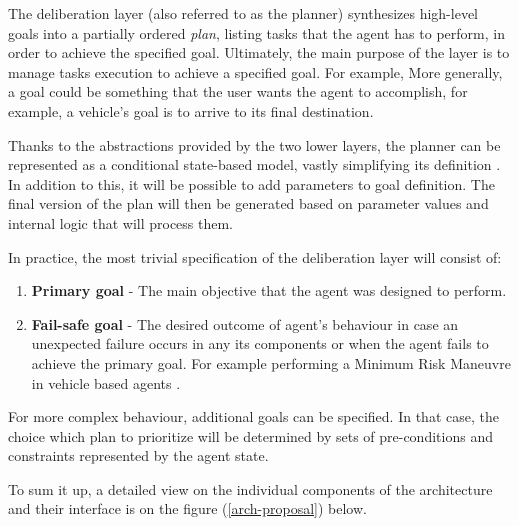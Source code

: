 \documentclass[main.tex]{subfiles}
\begin{document}
The deliberation layer (also referred to as the planner) synthesizes high-level goals into a
partially ordered \emph{plan}, listing tasks that the agent has to perform, in order to achieve
the specified goal. Ultimately, the main purpose of the layer is to manage tasks execution to
achieve a specified goal. For example,  More generally, a goal could be something that the user
wants the agent to accomplish, for example, a vehicle's goal is to arrive to its final
destination.

Thanks to the abstractions provided by the two lower layers, the planner can be represented as
a conditional state-based model, vastly simplifying its definition \cite{Bonasso1995}. In
addition to this, it will be possible to add parameters to goal definition. The final version of the plan 
will then be generated based on parameter values and internal logic that will process them.

In practice, the most trivial specification of the deliberation layer will consist of:

\begin{enumerate}[label=\alph*)]
    \item \textbf{Primary goal} - The main objective that the agent was designed to perform.
    \item \textbf{Fail-safe goal} - The desired outcome of agent's behaviour in case an unexpected 
    failure occurs in any its components or when the agent fails to achieve the primary goal. 
    For example performing a Minimum Risk Maneuvre in vehicle based agents
    \cite{WorkingAutonomous2022}. %
 \end{enumerate}

For more complex behaviour, additional goals can be specified. In that case, the choice which 
plan to prioritize will be determined by sets of pre-conditions and constraints represented by
the agent state.

To sum it up, a detailed view on the individual components of the architecture and their
interface is on the figure (\ref{arch-proposal}) below.
\end{document}
